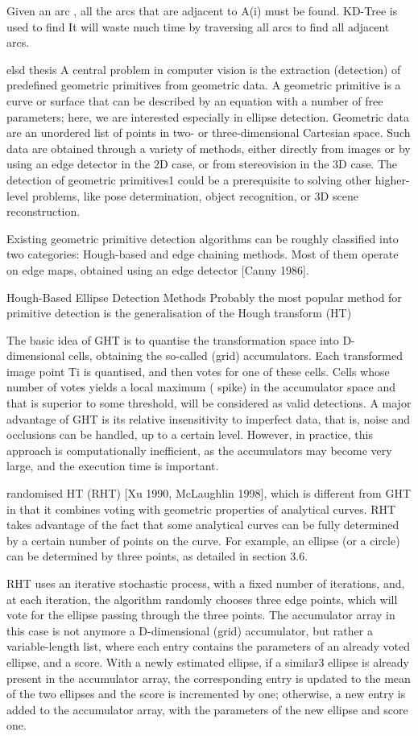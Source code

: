 \documentclass[a4paper]{report}
\begin{document}
Given an arc , all the arcs that are adjacent to A(i) must be found. KD-Tree is used to find
It will waste much
time by traversing all arcs to find all adjacent arcs.

elsd thesis
A central problem in computer vision is the extraction (detection) of predefined geometric primitives
from geometric data. A geometric primitive is a curve or surface that can be described
by an equation with a number of free parameters; here, we are interested especially in ellipse
detection. Geometric data are an unordered list of points in two- or three-dimensional Cartesian
space. Such data are obtained through a variety of methods, either directly from images or by
using an edge detector in the 2D case, or from stereovision in the 3D case. The detection of
geometric primitives1 could be a prerequisite to solving other higher-level problems, like pose
determination, object recognition, or 3D scene reconstruction.

Existing geometric primitive detection algorithms can be roughly classified into two categories:
Hough-based and edge chaining methods. Most of them operate on edge maps, obtained
using an edge detector [Canny 1986].

Hough-Based Ellipse Detection Methods
Probably the most popular method for primitive detection is the generalisation of the Hough transform (HT)

The
basic idea of GHT is to quantise the transformation space into D-dimensional cells, obtaining
the so-called (grid) accumulators. Each transformed image point Ti is quantised, and then
votes for one of these cells. Cells whose number of votes yields a local maximum ( spike) in the
accumulator space and that is superior to some threshold, will be considered as valid detections.
A major advantage of GHT is its relative insensitivity to imperfect data, that is, noise
and occlusions can be handled, up to a certain level. However, in practice, this approach is
computationally inefficient, as the accumulators may become very large, and the execution
time is important.

randomised HT (RHT) [Xu 1990, McLaughlin 1998],
which is different from GHT in that it combines voting with geometric properties of analytical
curves. RHT takes advantage of the fact that some analytical curves can be fully determined by
a certain number of points on the curve. For example, an ellipse (or a circle) can be determined
by three points, as detailed in section 3.6.

RHT uses an iterative stochastic process, with a
fixed number of iterations, and, at each iteration, the algorithm randomly chooses three edge
points, which will vote for the ellipse passing through the three points. The accumulator array
in this case is not anymore a D-dimensional (grid) accumulator, but rather a variable-length
list, where each entry contains the parameters of an already voted ellipse, and a score. With
a newly estimated ellipse, if a similar3 ellipse is already present in the accumulator array, the
corresponding entry is updated to the mean of the two ellipses and the score is incremented by
one; otherwise, a new entry is added to the accumulator array, with the parameters of the new
ellipse and score one.
\end{document}
